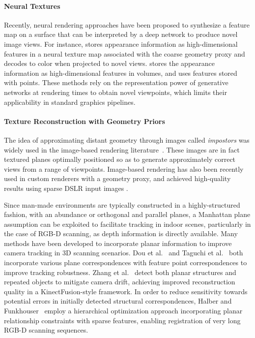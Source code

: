 \paragraph*{Neural Textures}
Recently, neural rendering approaches have been proposed to synthesize a feature map on a surface that can be interpreted by a deep network to produce novel image views.  For instance, \cite{thies2019deferred} stores appearance information as high-dimensional features in a neural texture map associated with the coarse geometry proxy and decodes to color when projected to novel views.  \cite{sitzmann2019deepvoxels} stores the appearance information as high-dimensional features in volumes, and \cite{aliev2019neural} uses features stored with points. These methods rely on the representation power of generative networks at rendering times to obtain novel viewpoints, which limits their applicability in standard graphics pipelines.

\paragraph*{Texture Reconstruction with Geometry Priors}
The idea of approximating distant geometry through images called {\em impostors} was widely used in the image-based rendering literature~\cite{sillion1997efficient,decoret1999multi}. 
These images are in fact textured planes optimally positioned so as to generate approximately correct views from a range of viewpoints.
Image-based rendering has also been recently used in custom renderers with a geometry proxy, and achieved high-quality results using sparse DSLR input images \cite{hedman2016scalable}.

Since man-made environments are typically constructed in a highly-structured fashion, with an abundance or orthogonal and parallel planes, a Manhattan plane assumption can be exploited to facilitate tracking in indoor scenes, particularly in the case of RGB-D scanning, as depth information is directly available.
Many methods have been developed to incorporate planar information to improve camera tracking in 3D scanning scenarios.
Dou et al.~\cite{dou2012exploring} and Taguchi et al.~\cite{taguchi2013point} both incorporate various plane correspondences with feature point correspondences to improve tracking robustness. %
Zhang et al.~\cite{zhang2015online} detect both planar structures and repeated objects to mitigate camera drift, achieving improved reconstruction quality in a KinectFusion-style framework.
In order to reduce sensitivity towards potential errors in initially detected structural correspondences, Halber and Funkhouser~\cite{halber2016fine} employ a hierarchical optimization approach incorporating planar relationship constraints with sparse features, enabling registration of very long RGB-D scanning sequences.

